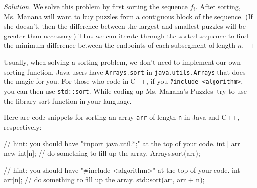 
\begin{proof}[Solution]
  We solve this problem by first sorting the sequence $f_i$. After sorting, Ms. Manana will want to buy puzzles from a contiguous block of the sequence. (If she doesn't, then the difference between the largest and smallest puzzles will be greater than necessary.) Thus we can iterate through the sorted sequence to find the minimum difference between the endpoints of each subsegment of length $n$.
\end{proof}

Usually, when solving a sorting problem, we don't need to implement our own sorting function. Java users have \texttt{Arrays.sort} in \texttt{java.utils.Arrays} that does the magic for you. For those who code in C++, if you \texttt{\#include <algorithm>}, you can then use \texttt{std::sort}. While coding up Ms. Manana's Puzzles, try to use the library sort function in your language.

Here are code snippets for sorting an array \texttt{arr} of length \texttt{n} in Java and C++, respectively:

\begin{mylstlisting}
// hint: you should have "import java.util.*;" at the top of your code.
int[] arr = new int[n];
// do something to fill up the array.
Arrays.sort(arr);
\end{mylstlisting}

\begin{mylstlisting}
// hint: you should have "#include <algorithm>" at the top of your code.
int arr[n];
// do something to fill up the array.
std::sort(arr, arr + n);
\end{mylstlisting}
\endgroup
